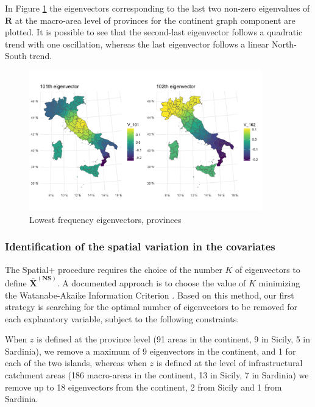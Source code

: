 \documentclass{book}
\begin{document}
In Figure \ref{fig:eigen_prov} the eigenvectors corresponding to the last two non-zero eigenvalues of $\mathbf{R}$ at the macro-area level of provinces for the continent graph component are plotted. It is possible to see that the second-last eigenvector follows a quadratic trend with one oscillation, whereas the last eigenvector follows a linear North-South trend.  

\begin{figure}
  \centering
  \includegraphics[width=0.9\textwidth]{eigen_prov.pdf} 
  \caption{Lowest frequency eigenvectors, provinces}
  \label{fig:eigen_prov}
\end{figure}


\subsubsection{Identification of the spatial variation in the covariates}\label{par:k}
The Spatial+ procedure requires the choice of the number $K$ of eigenvectors to define $\mathbf{\bar{X}^{(NS)}}$. A documented approach \citep{Urdangarin24, Lamouroux} is to choose the value of $K$ minimizing the Watanabe-Akaike Information Criterion \citep[WAIC,][]{WAIC}. Based on this method, our first strategy is searching for the optimal number of eigenvectors to be removed for each explanatory variable, subject to the following constraints.

When $z$ is defined at the province level (91 areas in the continent, 9 in Sicily, 5 in Sardinia), we remove a maximum of 9 eigenvectors in the continent, and 1 for each of the two islands, whereas when $z$ is defined at the level of infrastructural catchment areas (186 macro-areas in the continent, 13 in Sicily, 7 in Sardinia) we remove up to 18 eigenvectors from the continent, 2 from Sicily and 1 from Sardinia.
\end{document}
